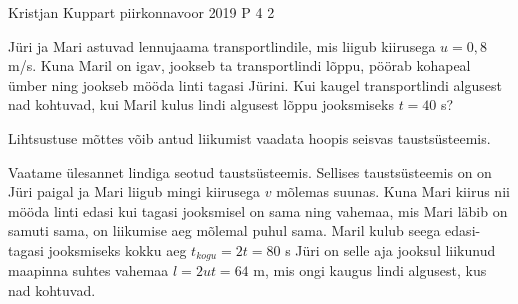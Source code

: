 {Kristjan Kuppart} %
{piirkonnavoor} %
{2019} %
{P 4} %
{2} %
{

\ifStatement
Jüri ja Mari astuvad lennujaama transportlindile, mis liigub kiirusega $u = 0,8$ m/s. Kuna Maril on igav, jookseb ta transportlindi lõppu, pöörab kohapeal ümber ning jookseb mööda linti tagasi Jürini. Kui kaugel transportlindi algusest nad kohtuvad, kui Maril kulus lindi algusest lõppu jooksmiseks $t = 40$ s?
\fi

\ifHint
Lihtsustuse mõttes võib antud liikumist vaadata hoopis seisvas taustsüsteemis.
\fi

\ifSolution
Vaatame ülesannet lindiga seotud taustsüsteemis. Sellises taustsüsteemis on on Jüri paigal ja Mari liigub mingi kiirusega $v$ mõlemas suunas. Kuna Mari kiirus nii mööda linti edasi kui tagasi jooksmisel on sama ning vahemaa, mis Mari läbib on samuti sama, on liikumise aeg mõlemal puhul sama. Maril kulub seega edasi-tagasi jooksmiseks kokku aeg $t_{kogu} = 2t = 80$ s Jüri on selle aja jooksul liikunud maapinna suhtes vahemaa $l = 2ut = 64$ m, mis ongi kaugus lindi algusest, kus nad kohtuvad.
\fi
}
